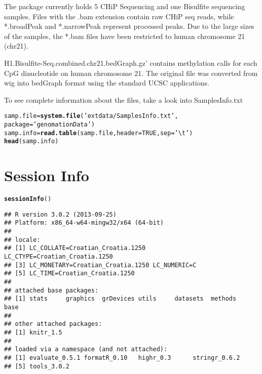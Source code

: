 \documentclass[12pt]{article}\usepackage[]{graphicx}\usepackage[]{color}
\makeatletter
\newcommand{\hlnum}[1]{\textcolor[rgb]{0.686,0.059,0.569}{#1}}%
\newcommand{\hlstr}[1]{\textcolor[rgb]{0.192,0.494,0.8}{#1}}%
\newcommand{\hlstd}[1]{\textcolor[rgb]{0.345,0.345,0.345}{#1}}%
\newcommand{\hlkwb}[1]{\textcolor[rgb]{0.69,0.353,0.396}{#1}}%
\newcommand{\hlkwc}[1]{\textcolor[rgb]{0.333,0.667,0.333}{#1}}%
\newcommand{\hlkwd}[1]{\textcolor[rgb]{0.737,0.353,0.396}{\textbf{#1}}}%
\newenvironment{kframe}{%
 \def\at@end@of@kframe{}%
 \ifinner\ifhmode%
  \def\at@end@of@kframe{\end{minipage}}%
  \begin{minipage}{\columnwidth}%
 \fi\fi%
 \def\FrameCommand##1{\hskip\@totalleftmargin \hskip-\fboxsep
 \colorbox{shadecolor}{##1}\hskip-\fboxsep
     \hskip-\linewidth \hskip-\@totalleftmargin \hskip\columnwidth}%
 \MakeFramed {\advance\hsize-\width
   \@totalleftmargin\z@ \linewidth\hsize
   \@setminipage}}%
 {\par\unskip\endMakeFramed%
 \at@end@of@kframe}
\newenvironment{knitrout}{}{} %
\makeatother
\begin{document}
The package currently holds 5 CHiP Sequencing and one Bisulfite sequencing 
samples. 
Files with the .bam extension contain raw CHiP seq reads, while *.broadPeak and 
*.narrowPeak represent processed peaks. 
Due to the large sizes of the samples, the *.bam files have been restricted to 
human chromosome 21 (chr21).

H1.Bisulfite-Seq.combined.chr21.bedGraph.gz' contains methylation calls for each
CpG dinucleotide on human chromosome 21. 
The original file was converted from wig into bedGraph format using the standard
UCSC applications.

To see complete information about the files, take a look into SamplesInfo.txt
\begin{knitrout}
\color{fgcolor}\begin{kframe}
\begin{alltt}
\hlstd{samp.file} \hlkwb{=} \hlkwd{system.file}\hlstd{(}\hlstr{'extdata/SamplesInfo.txt'}\hlstd{,}
                        \hlkwc{package}\hlstd{=}\hlstr{'genomationData'}\hlstd{)}
\hlstd{samp.info} \hlkwb{=} \hlkwd{read.table}\hlstd{(samp.file,} \hlkwc{header}\hlstd{=}\hlnum{TRUE}\hlstd{,} \hlkwc{sep}\hlstd{=}\hlstr{'\textbackslash{}t'}\hlstd{)}
\hlkwd{head}\hlstd{(samp.info)}
\end{alltt}
\end{kframe}
\end{knitrout}


\section{Session Info}
\begin{knitrout}
\color{fgcolor}\begin{kframe}
\begin{alltt}
\hlkwd{sessionInfo}\hlstd{()}
\end{alltt}
\begin{verbatim}
## R version 3.0.2 (2013-09-25)
## Platform: x86_64-w64-mingw32/x64 (64-bit)
## 
## locale:
## [1] LC_COLLATE=Croatian_Croatia.1250  LC_CTYPE=Croatian_Croatia.1250   
## [3] LC_MONETARY=Croatian_Croatia.1250 LC_NUMERIC=C                     
## [5] LC_TIME=Croatian_Croatia.1250    
## 
## attached base packages:
## [1] stats     graphics  grDevices utils     datasets  methods   base     
## 
## other attached packages:
## [1] knitr_1.5
## 
## loaded via a namespace (and not attached):
## [1] evaluate_0.5.1 formatR_0.10   highr_0.3      stringr_0.6.2 
## [5] tools_3.0.2
\end{verbatim}
\end{kframe}
\end{knitrout}




\end{document}
